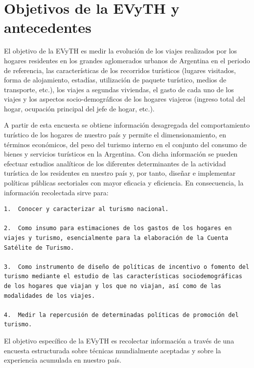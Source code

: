 \documentclass[
  openany]{book}
\begin{document}
\hypertarget{objetivos-de-la-evyth-y-antecedentes}{%
\section{Objetivos de la EVyTH y antecedentes}\label{objetivos-de-la-evyth-y-antecedentes}}

El objetivo de la EVyTH es medir la evolución de los viajes realizados por los hogares residentes en los grandes aglomerados urbanos de Argentina en el periodo de referencia, las características de los recorridos turísticos (lugares visitados, forma de alojamiento, estadías, utilización de paquete turístico, medios de transporte, etc.), los viajes a segundas viviendas, el gasto de cada uno de los viajes y los aspectos socio-demográficos de los hogares viajeros (ingreso total del hogar, ocupación principal del jefe de hogar, etc.).

A partir de esta encuesta se obtiene información desagregada del comportamiento turístico de los hogares de nuestro país y permite el dimensionamiento, en términos económicos, del peso del turismo interno en el conjunto del consumo de bienes y servicios turísticos en la Argentina. Con dicha información se pueden efectuar estudios analíticos de los diferentes determinantes de la actividad turística de los residentes en nuestro país y, por tanto, diseñar e implementar políticas públicas sectoriales con mayor eficacia y eficiencia. En consecuencia, la información recolectada sirve para:

\begin{verbatim}
1.  Conocer y caracterizar al turismo nacional.

2.  Como insumo para estimaciones de los gastos de los hogares en viajes y turismo, esencialmente para la elaboración de la Cuenta Satélite de Turismo.

3.  Como instrumento de diseño de políticas de incentivo o fomento del turismo mediante el estudio de las características sociodemográficas de los hogares que viajan y los que no viajan, así como de las modalidades de los viajes.

4.  Medir la repercusión de determinadas políticas de promoción del turismo.
\end{verbatim}

El objetivo específico de la EVyTH es recolectar información a través de una encuesta estructurada sobre técnicas mundialmente aceptadas y sobre la experiencia acumulada en nuestro país.
\end{document}
